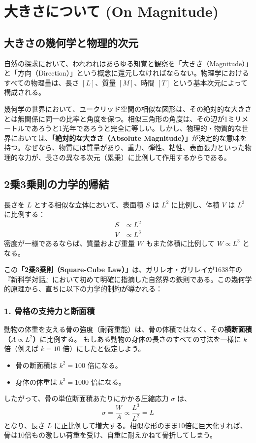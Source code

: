 \chapter{大きさについて (On Magnitude)}

\section{大きさの幾何学と物理的次元}

自然の探求において、われわれはあらゆる知覚と観察を「大きさ（Magnitude）」と「方向（Direction）」という概念に還元しなければならない。物理学におけるすべての物理量は、長さ $[L]$、質量 $[M]$、時間 $[T]$ という基本次元によって構成される。

幾何学の世界において、ユークリッド空間の相似な図形は、その絶対的な大きさとは無関係に同一の比率と角度を保つ。相似三角形の角度は、その辺が1ミリメートルであろうと1光年であろうと完全に等しい。しかし、物理的・物質的な世界においては、\textbf{「絶対的な大きさ（Absolute Magnitude）」}が決定的な意味を持つ。なぜなら、物質には質量があり、重力、弾性、粘性、表面張力といった物理的な力が、長さの異なる次元（累乗）に比例して作用するからである。

\section{2乗3乗則の力学的帰結}

長さを $L$ とする相似な立体において、表面積 $S$ は $L^2$ に比例し、体積 $V$ は $L^3$ に比例する：
\begin{align}
    S &\propto L^2 \\
    V &\propto L^3
\end{align}
密度が一様であるならば、質量および重量 $W$ もまた体積に比例して $W \propto L^3$ となる。

この\textbf{「2乗3乗則（Square-Cube Law）」}は、ガリレオ・ガリレイが1638年の『新科学対話』において初めて明確に指摘した自然界の鉄則である。この幾何学的原理から、直ちに以下の力学的制約が導かれる：

\subsection{1. 骨格の支持力と断面積}
動物の体重を支える骨の強度（耐荷重能）は、骨の体積ではなく、その\textbf{横断面積（$A \propto L^2$）}に比例する。
もしある動物の身体の長さのすべての寸法を一様に $k$ 倍（例えば $k=10$ 倍）にしたと仮定しよう。
\begin{itemize}
    \item 骨の断面積は $k^2 = 100$ 倍になる。
    \item 身体の体重は $k^3 = 1000$ 倍になる。
\end{itemize}
したがって、骨の単位断面積あたりにかかる圧縮応力 $\sigma$ は、
\begin{equation}
    \sigma = \frac{W}{A} \propto \frac{L^3}{L^2} = L
\end{equation}
となり、長さ $L$ に正比例して増大する。相似な形のまま10倍に巨大化すれば、骨は10倍もの激しい荷重を受け、自重に耐えかねて骨折してしまう。

